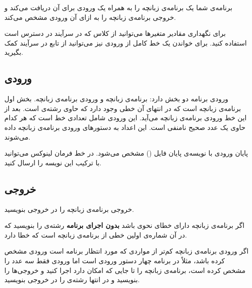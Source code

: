 \documentclass{utap}
\begin{document}
	برنامه‌ی شما یک برنامه‌ی زبانچه را به همراه یک ورودی برای آن دریافت می‌کند و خروجی برنامه‌ی زبانچه را به ازای آن ورودی مشخص می‌کند.
	
	برای نگهداری مقادیر متغیرها می‌توانید از کلاس  که در سرآیند  در دسترس است استفاده کنید.
	برای خواندن یک خط کامل از ورودی نیز می‌توانید از تابع  در سرآیند  کمک بگیرید.
	
	\subsection{ورودی}
	
	ورودی برنامه دو بخش دارد: برنامه‌ی زبانچه و ورودی برنامه‌ی زبانچه.    
	بخش اول برنامه‌ی زبانچه است که در انتهای آن خطی وجود دارد که حاوی رشته‌ی  است.
	بعد از این خط ورودی برنامه‌ی زبانچه می‌آید. این ورودی شامل تعدادی خط است که هر کدام حاوی یک عدد صحیح نامنفی است. این اعداد به دستورهای ورودی برنامه‌ی زبانچه داده می‌شوند.
	
	پایان ورودی با نویسه‌ی پایان فایل () مشخص می‌شود. در خط فرمان لینوکس می‌توانید با ترکیب  این نویسه را ارسال کنید.
	
	\subsection{خروجی}
	
	خروجی برنامه‌ی زبانچه را در خروجی بنویسید.
	
	اگر برنامه‌ی زبانچه دارای خطای نحوی باشد \textbf{بدون اجرای برنامه} رشته‌ی  را بنویسید که در آن  شماره‌ی اولین خطی از برنامه‌ی زبانچه است که خطا دارد.
	
	اگر ورودی برنامه‌ی زبانچه کم‌تر از مواردی که مورد انتظار برنامه است ورودی مشخص کرده باشد، مثلاً در برنامه چهار دستور ورودی است اما ورودی فقط سه عدد را مشخص کرده است، برنامه‌ی زبانچه را تا جایی که امکان دارد اجرا کنید و خروجی‌ها را بنویسید و در انتها رشته‌ی  را در خروجی بنویسید.
	
	
\end{document}
